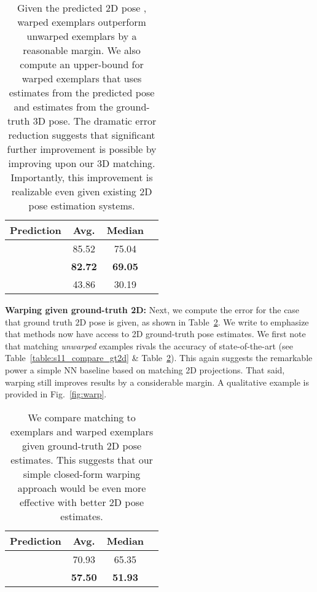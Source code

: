 \documentclass[10pt,twocolumn,letterpaper]{article}
\begin{document}
\begin{table}[t!]
\centering
\begin{tabular}{|l|c|c|c|}
\hline
Prediction & Avg. & Median \\
\hline
\hline
 & 85.52 & 75.04\\
 & \textbf{82.72} & \textbf{69.05}\\
\hline
 & 43.86 & 30.19\\
\hline
\end{tabular}
\caption{Given the predicted 2D pose , warped exemplars  outperform unwarped exemplars  by a reasonable margin. We also compute an upper-bound for warped exemplars that uses  estimates from the predicted pose and  estimates from the ground-truth 3D pose. The dramatic error reduction suggests that significant further improvement is possible by improving upon our 3D matching. Importantly, this improvement is realizable even given existing 2D pose estimation systems.}
\label{table: cpm_nn_comp}
\end{table}

{\bf Warping given ground-truth 2D:} Next, we compute the error for the case that ground truth 2D pose is given, as shown in Table~\ref{table: gt2d_nn_comp}. We write  to emphasize that methods now have access to 2D ground-truth pose estimates. We first note that matching {\em unwarped} examples rivals the accuracy of state-of-the-art (see Table~\ref{table:s11_compare_gt2d} \& Table~\ref{table: gt2d_nn_comp}). This again suggests the remarkable power a simple NN baseline based on matching 2D projections. That said, warping still improves results by a considerable margin. A qualitative example is provided in Fig.~\ref{fig:warp}.

\begin{table}[t!]
\centering
\begin{tabular}{|l|c|c|c|}
\hline
Prediction & Avg. & Median \\
\hline
\hline
 & 70.93 & 65.35\\
 & \textbf{57.50} & \textbf{51.93}\\
\hline
\end{tabular}
\caption{We compare matching to exemplars  and warped exemplars  given ground-truth 2D pose estimates. This suggests that our simple closed-form warping approach would be even more effective with better 2D pose estimates.}
\label{table: gt2d_nn_comp}
\end{table}
\end{document}
